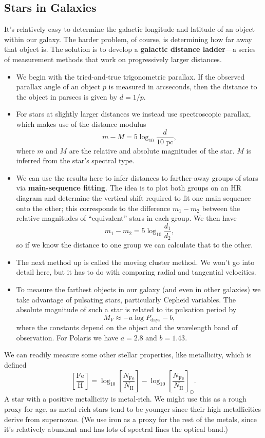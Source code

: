 \documentclass[../a062main.tex]{subfiles}
\begin{document}
\subsection*{Stars in Galaxies}
It's relatively easy to determine the galactic longitude and latitude of an object within our galaxy.
The harder problem, of course, is determining how far away that object is.
The solution is to develop a \textbf{galactic distance ladder}---a series of measurement methods that work on progressively larger distances.
\begin{itemize}
    \item We begin with the tried-and-true trigonometric parallax.
    If the observed parallax angle of an object $p$ is measured in arcseconds, then the distance to the object in parsecs is given by $d = 1 / p$.

    \item For stars at slightly larger distances we instead use spectroscopic parallax, which makes use of the distance modulus
    \[ m - M = 5 \log_{10} \frac{d}{10 \textrm{ pc}}, \]
    where $m$ and $M$ are the relative and absolute magnitudes of the star.
    $M$ is inferred from the star's spectral type.

    \item We can use the results here to infer distances to farther-away groups of stars via \textbf{main-sequence fitting}.
    The idea is to plot both groups on an HR diagram and determine the vertical shift required to fit one main sequence onto the other; this corresponds to the difference $m_1 - m_2$ between the relative magnitudes of ``equivalent'' stars in each group.
    We then have
    \[ m_1 - m_2 = 5 \log_{10} \frac{d_1}{d_2}, \]
    so if we know the distance to one group we can calculate that to the other.

    \item The next method up is called the moving cluster method.
    We won't go into detail here, but it has to do with comparing radial and tangential velocities.

    \item To measure the farthest objects in our galaxy (and even in other galaxies) we take advantage of pulsating stars, particularly Cepheid variables.
    The absolute magnitude of such a star is related to its pulsation period by
    \[ M_V \approx -a \log P_\textrm{days} - b, \]
    where the constants depend on the object and the wavelength band of observation.
    For Polaris we have $a = 2.8$ and $b = 1.43$.
\end{itemize}
We can readily measure some other stellar properties, like metallicity, which is defined
\[ \boxed{\left[ \frac{\textrm{Fe}}{\textrm{H}} \right] = \log_{10} \left[ \frac{N_\textrm{Fe}}{N_\textrm{H}} \right] - \log_{10} \left[ \frac{N_\textrm{Fe}}{N_\textrm{H}} \right]_\odot}. \]
A star with a positive metallicity is metal-rich.
We might use this as a rough proxy for age, as metal-rich stars tend to be younger since their high metallicities derive from supernovae.
(We use iron as a proxy for the rest of the metals, since it's relatively abundant and has lots of spectral lines  the optical band.)
\end{document}
